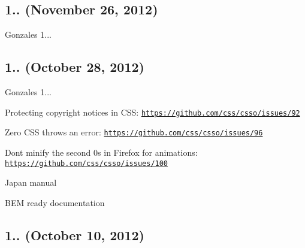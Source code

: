 \subsection*{1.. (November 26, 2012)}


\begin{DoxyItemize}
\item Gonzales 1...
\end{DoxyItemize}

\subsection*{1.. (October 28, 2012)}


\begin{DoxyItemize}
\item Gonzales 1...
\item Protecting copyright notices in C\+SS\+: \href{https://github.com/css/csso/issues/92}{\tt https\+://github.\+com/css/csso/issues/92}
\item Zero C\+SS throws an error\+: \href{https://github.com/css/csso/issues/96}{\tt https\+://github.\+com/css/csso/issues/96}
\item Don\textquotesingle{}t minify the second {\ttfamily 0s} in Firefox for animations\+: \href{https://github.com/css/csso/issues/100}{\tt https\+://github.\+com/css/csso/issues/100}
\item Japan manual
\item B\+EM ready documentation
\end{DoxyItemize}

\subsection*{1.. (October 10, 2012)}


\begin{DoxyItemize}
\item 
\end{DoxyItemize}